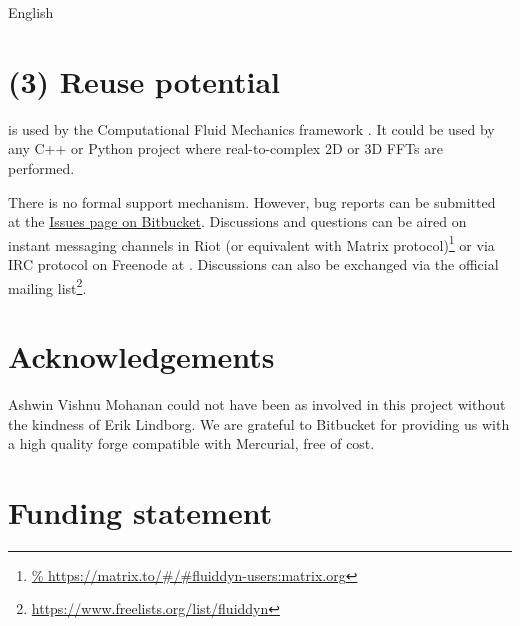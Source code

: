 \documentclass{../jors}
\begin{document}

English

\section*{(3) Reuse potential}


 is used by the Computational Fluid Mechanics framework
 \citep{fluidsim}. It could be used by any C++ or Python project
where real-to-complex 2D or 3D FFTs are performed.

There is no formal support mechanism. However, bug reports can be submitted at
the \href{https://bitbucket.org/fluiddyn/fluidsim/issues}{Issues page on
Bitbucket}. Discussions and questions can be aired on instant messaging
channels in Riot (or equivalent with Matrix protocol)\footnote{
\url{%
  https://matrix.to/\#/\#fluiddyn-users:matrix.org}}
or via IRC protocol on Freenode at . Discussions
can also be exchanged via the official mailing list\footnote{
\url{https://www.freelists.org/list/fluiddyn}}.

\section*{Acknowledgements}


Ashwin Vishnu Mohanan could not have been as involved in this project without the
kindness of Erik Lindborg.
%
We are grateful to Bitbucket for providing us with a high quality forge
compatible with Mercurial, free of cost.

\section*{Funding statement}
\end{document}
